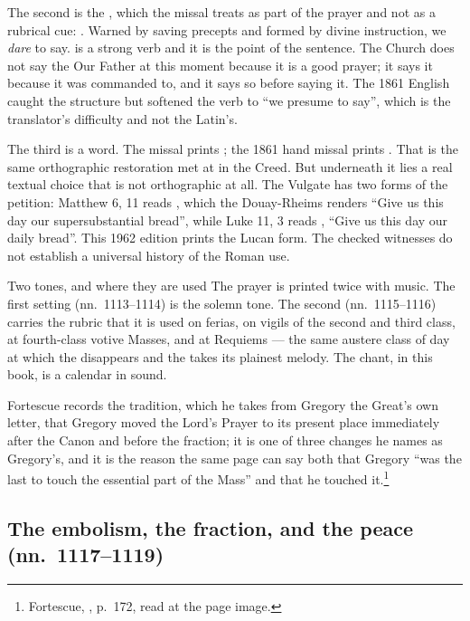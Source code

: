 The second is the , which the missal treats as part of the
prayer and not as a rubrical cue: . Warned by saving precepts and
formed by divine instruction, we \emph{dare} to say.  is a
strong verb and it is the point of the sentence. The Church does not say the Our
Father at this moment because it is a good prayer; it says it because it was
commanded to, and it says so before saying it. The 1861 English caught the
structure but softened the verb to ``we presume to say'', which is the
translator's difficulty and not the Latin's.

The third is a word. The missal prints ; the 1861 hand missal prints . That is
the same orthographic restoration met at  in the Creed. But
underneath it lies a real textual choice that is not orthographic at all. The
Vulgate has two forms of the petition: Matthew 6, 11 reads , which the Douay-Rheims renders ``Give us this day
our supersubstantial bread'', while Luke 11, 3 reads , ``Give us this day our daily bread''. This 1962 edition prints the
Lucan form. The checked witnesses do not establish a universal history of the
Roman use.

\begin{rubricnote}{Two tones, and where they are used}
The prayer is printed twice with music. The first setting (nn.~1113--1114) is
the solemn tone. The second (nn.~1115--1116) carries the rubric that it is used
on ferias, on vigils of the second and third class, at fourth-class votive
Masses, and at Requiems --- the same austere class of day at which the
 disappears and the  takes its
plainest melody. The chant, in this book, is a calendar in sound.
\end{rubricnote}

Fortescue records the tradition, which he takes from Gregory the Great's own
letter, that Gregory moved the Lord's Prayer to its present place immediately
after the Canon and before the fraction; it is one of three changes he names as
Gregory's, and it is the reason the same page can say both that Gregory ``was
the last to touch the essential part of the Mass'' and that he touched
it.\footnote{Fortescue, , p.~172, read at the page image.}

\subsection*{The embolism, the fraction, and the peace (nn.~1117--1119)}

